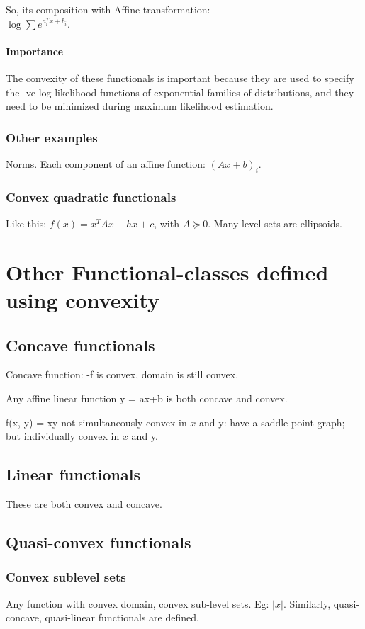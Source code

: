 \documentclass[oneside, article]{memoir}
\begin{document}
So, its composition with Affine transformation: \\$\log \sum e^{a_i^{T}x + b_i}$.

\paragraph*{Importance}
The convexity of these functionals is important because they are used to specify the -ve log likelihood functions of exponential families of distributions, and they need to be minimized during maximum likelihood estimation.

\subsubsection{Other examples}
Norms. Each component of an affine function: $(Ax + b)_i$.

\subsubsection{Convex quadratic functionals}
Like this: $f(x) = x^{T}Ax + hx + c$, with $A \succeq 0$. Many level sets are ellipsoids.

\section{Other Functional-classes defined using convexity}
\subsection{Concave functionals}
Concave function: -f is convex, domain is still convex.

Any affine linear function y = ax+b is both concave and convex.

f(x, y) = xy not simultaneously convex in $x$ and y: have a saddle point graph; but individually convex in $x$ and y.

\subsection{Linear functionals}
These are both convex and concave.

\subsection{Quasi-convex functionals}
\subsubsection{Convex sublevel sets}
Any function with convex domain, convex sub-level sets. Eg: $|x|$. Similarly, quasi-concave, quasi-linear functionals are defined.
\end{document}
